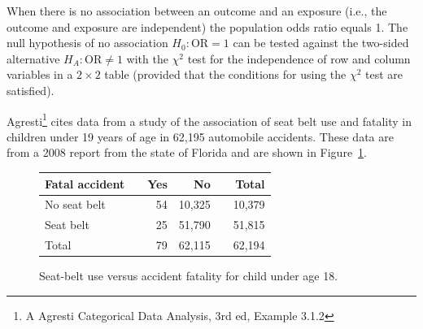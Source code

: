 

When there is no association between an outcome and an exposure (i.e., the outcome and exposure are independent) the population odds ratio equals 1. The null hypothesis of no association $H_0:\text{OR} = 1$ can be tested against the two-sided alternative $H_A:\text{OR} \neq 1$ with the $\chi^2$ test for the independence of row and column variables in a $2 \times 2$ table (provided that the conditions for using the $\chi^2$ test are satisfied).

Agresti\footnote{A Agresti Categorical Data Analysis, 3rd ed, Example 3.1.2} cites data from a study of the association of seat belt use and fatality in children under 19 years of age in 62,195 automobile accidents.  These data are from a 2008 report from the state of Florida and are shown in Figure~\ref{figure:seatbeltUseFatalAutoAccidents}.

\begin{figure}[h]
	\centering
	\begin{tabular}{ll rrr r}
		\hline
		Fatal accident	 & \hspace{2mm} & Yes & No & \hspace{2mm} & Total \\
		\hline
        No seat belt & & 54 & 10,325 & & 10,379    \\
        Seat belt &	& 25 & 51,790 & & 51,815    \\
        Total & & 79 & 62,115 & & 62,194 \\
		\hline
	\end{tabular}
	\caption{Seat-belt use versus accident fatality for child under age 18.}
    \label{figure:seatbeltUseFatalAutoAccidents}
\end{figure}	





